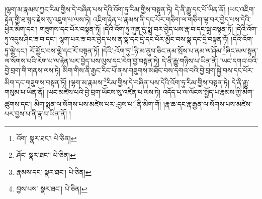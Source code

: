 །ལྷག་མ་རྣམས་ཀྱང་རིམ་གྱིས་དེ་བཞིན་པས་དེའི་འོག་ཏུ་རིམ་གྱིས་བསྟན་ཏེ། དེ་ནི་རྒྱུ་དང་པོ་ཡིན་ནོ། །ཡང་འཇིག་རྟེན་གྱི་ཐ་སྙད་རྗེས་སུ་འཇུག་པ་ལས་ཏེ། འཇིག་རྟེན་པ་རྣམས་ནི་དང་པོར་གཅིག་ལ་གཅིག་ལྟ་བར་བྱེད་པས་དེའི་ཕྱིར་མིག་དང་། གཟུགས་དང་པོར་བསྟན་ཏོ། །དེའི་འོག་ཏུ་ཀུན་དུ་སྨྲ་བར་བྱེད་པས་རྣ་བ་དང་སྒྲ་བསྟན་ཏོ། །དེའི་འོག་ཏུ་འདུས་ཤིང་ཟ་བ་དང་། ལྷག་པར་ཟ་བར་བྱེད་པས་ན་སྣ་དང་དྲི་དང་པོར་མྱོང་བས་སྣ་དང་དྲི་བསྟན་ཏོ། །དེའི་འོག་ཏུ་ལྕེ་དང་། རོ་མྱོང་བས་ལྕེ་དང་རོ་བསྟན་ཏོ། །དེའི་:འོག་ཏུ་\footnote{འོག་  སྣར་ཐང་།  པེ་ཅིན། }ཉི་མ་ནུབ་ཅིང་ནམ་སྲོས་པ་ནམ་ལ་ཤོམ་\footnote{ཤོང་  སྣར་ཐང་།  པེ་ཅིན། }ཞིང་མལ་སྟན་ལ་སོགས་པའི་རེག་པ་ལ་རྟེན་པར་བྱེད་པས་ལུས་དང་རེག་བྱ་བསྟན་ཏེ། དེ་ནི་རྒྱུ་གཉིས་པ་ཡིན་ནོ། །ཡང་དགའ་བའི་བྱེ་བྲག་གི་གནས་ལས་ཏེ། མིག་གིས་ནི་རྒྱང་རིང་པོ་ནས་གཟུགས་མཐོང་བས་དགའ་བའི་བྱེ་བྲག་སྐྱེ་བས་དང་པོར་མིག་དང་གཟུགས་བསྟན་ཏོ། །ལྷག་མ་རྣམས་\footnote{རྣམས་དང་  སྣར་ཐང་།  པེ་ཅིན། }རིམ་གྱིས་དེ་བཞིན་པས་དེའི་འོག་ཏུ་རིམ་གྱིས་བསྟན་ཏེ། དེ་ནི་རྒྱུ་གསུམ་པ་ཡིན་ནོ། །ཡང་མཛེས་པའི་བྱེ་བྲག་ཡོངས་སུ་འཛིན་པ་ལས་ཏེ། འདོད་པ་ལ་ལོངས་སྤྱོད་པ་རྣམས་ཀྱི་མིག་ཚུགས་དང་། མིག་སྨན་ལ་སོགས་པས་མཛེས་པར་:བྱས་པ་\footnote{བྱས་པས་  སྣར་ཐང་།  པེ་ཅིན། }ནི་མིག་གོ། །རྣ་ཆ་དང་རྣ་རྒྱན་ལ་སོགས་པས་མཛེས་པར་བྱས་པ་ནི་རྣ་བ་ཡིན་ནོ། །
